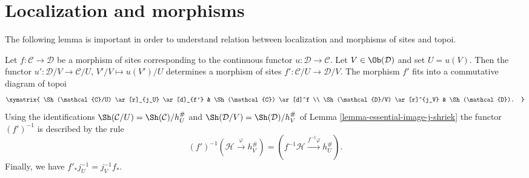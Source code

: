 \section{Localization and morphisms}
\label{section-localize-morphisms}

\noindent
The following lemma is important in order to understand relation
between localization and morphisms of sites and topoi.

\begin{lemma}
\label{lemma-localize-morphism}
Let $f : \mathcal{C} \to \mathcal{D}$ be a morphism of sites
corresponding to the continuous functor $u : \mathcal{D} \to \mathcal{C}$.
Let $V \in \Ob(\mathcal{D})$ and set $U = u(V)$.
Then the functor $u' : \mathcal{D}/V \to \mathcal{C}/U$,
$V'/V \mapsto u(V')/U$ determines a morphism of sites
$f' : \mathcal{C}/U \to \mathcal{D}/V$.
The morphism $f'$ fits into a commutative diagram of topoi
$$
\xymatrix{
\Sh(\mathcal{C}/U) \ar[r]_{j_U} \ar[d]_{f'} &
\Sh(\mathcal{C}) \ar[d]^f \\
\Sh(\mathcal{D}/V) \ar[r]^{j_V} &
\Sh(\mathcal{D}).
}
$$
Using the identifications
$\Sh(\mathcal{C}/U) = \Sh(\mathcal{C})/h_U^\#$ and
$\Sh(\mathcal{D}/V) = \Sh(\mathcal{D})/h_V^\#$ of
Lemma \ref{lemma-essential-image-j-shriek}
the functor $(f')^{-1}$ is described by the rule
$$
(f')^{-1}(\mathcal{H} \xrightarrow{\varphi} h_V^\#)
=
(f^{-1}\mathcal{H} \xrightarrow{f^{-1}\varphi} h_U^\#).
$$
Finally, we have $f'_*j_U^{-1} = j_V^{-1}f_*$.
\end{lemma}

